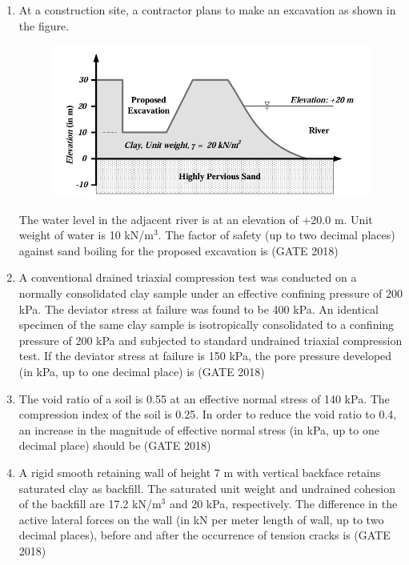\documentclass[journal,12pt,onecolumn]{IEEEtran}
\theoremstyle{remark}
\begin{document}
\begin{enumerate}
\item At a construction site, a contractor plans to make an excavation as shown in the figure.
\begin{figure}[h]
    \centering
    \includegraphics[width=0.5\linewidth]{GATE-CE-2018/44-1.png}
    \caption{}
    \label{44-1}
\end{figure}
The water level in the adjacent river is at an elevation of +20.0 m. Unit weight of water is 10 kN/m$^3$. The factor of safety (up to two decimal places) against sand boiling for the proposed excavation is \underline{\hspace{3cm}}
\hfill{(GATE 2018)}
\vspace{1cm}

\item A conventional drained triaxial compression test was conducted on a normally consolidated clay sample under an effective confining pressure of 200 kPa. The deviator stress at failure was found to be 400 kPa. An identical specimen of the same clay sample is isotropically consolidated to a confining pressure of 200 kPa and subjected to standard undrained triaxial compression test. If the deviator stress at failure is 150 kPa, the pore pressure developed (in kPa, up to one decimal place) is \underline{\hspace{3cm}}
\hfill{(GATE 2018)}
\vspace{1cm}

\item The void ratio of a soil is 0.55 at an effective normal stress of 140 kPa. The compression index of the soil is 0.25. In order to reduce the void ratio to 0.4, an increase in the magnitude of effective normal stress (in kPa, up to one decimal place) should be \underline{\hspace{3cm}}
\hfill{(GATE 2018)}
\vspace{1cm}

\item A rigid smooth retaining wall of height 7 m with vertical backface retains saturated clay as backfill. The saturated unit weight and undrained cohesion of the backfill are 17.2 kN/m$^3$ and 20 kPa, respectively. The difference in the active lateral forces on the wall (in kN per meter length of wall, up to two decimal places), before and after the occurrence of tension cracks is \underline{\hspace{3cm}}
\hfill{(GATE 2018)}
\vspace{1cm}


\end{enumerate}
\end{document}
